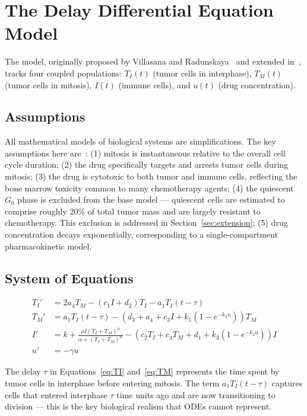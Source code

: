 \section{The Delay Differential Equation Model}
\label{sec:model}

The model, originally proposed by Villasana and Radunskaya~\cite{villasana2003} and extended in~\cite{villasana2004}, tracks four coupled populations: $T_I(t)$ (tumor cells in interphase), $T_M(t)$ (tumor cells in mitosis), $I(t)$ (immune cells), and $u(t)$ (drug concentration).

\subsection{Assumptions}

All mathematical models of biological systems are simplifications. The key assumptions here are~\cite{villasana2003}: (1) mitosis is instantaneous relative to the overall cell cycle duration; (2) the drug specifically targets and arrests tumor cells during mitosis; (3) the drug is cytotoxic to both tumor and immune cells, reflecting the bone marrow toxicity common to many chemotherapy agents; (4) the quiescent $G_0$ phase is excluded from the base model --- quiescent cells are estimated to comprise roughly 20\% of total tumor mass and are largely resistant to chemotherapy. This exclusion is addressed in Section~\ref{sec:extension}; (5) drug concentration decays exponentially, corresponding to a single-compartment pharmacokinetic model.

\subsection{System of Equations}

\begin{align}
  T_I' &= 2a_4T_M - (c_1I + d_2)T_I - a_1T_I(t-\tau) \label{eq:TI} \\
  T_M' &= a_1T_I(t-\tau) - (d_3 + a_4 + c_3I + k_1(1-e^{-k_2u}))T_M \label{eq:TM} \\
  I'   &= k + \frac{\rho I(T_I+T_M)^n}{\alpha+(T_I+T_M)^n}
           - (c_2T_I + c_4T_M + d_1 + k_3(1-e^{-k_2u}))I \label{eq:I} \\
  u'   &= -\gamma u \label{eq:u}
\end{align}

The delay $\tau$ in Equations~\ref{eq:TI} and~\ref{eq:TM} represents the time spent by tumor cells in interphase before entering mitosis. The term $a_1T_I(t-\tau)$ captures cells that entered interphase $\tau$ time units ago and are now transitioning to division --- this is the key biological realism that ODEs cannot represent.

